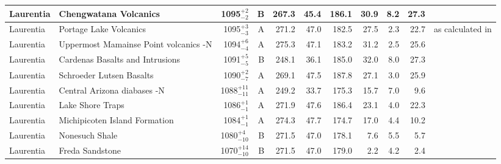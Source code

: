 \documentclass[twocolumn, switch]{article} %
\begin{document}
{\begin{landscape}
\begin{ThreePartTable}
\begin{longtable}{p{1.4 in}p{1.2 in}rrrrrrrrp{1.2 in}}
                     Laurentia &                              Chengwatana Volcanics &     1095$^{+2}_{-2}$ &      B &     267.3 &      45.4 & 186.1 &  30.9 &       8.2 &        27.3 &                                   \cite{Kean1997a} \\ \hline
                     Laurentia &                             Portage Lake Volcanics &     1095$^{+3}_{-3}$ &      A &     271.2 &      47.0 & 182.5 &  27.5 &       2.3 &        22.7 &  \cite{Books1972a, Hnat2006a} as calculated in \cite{Swanson-Hysell2019a} \\ \hline
                     Laurentia &              Uppermost Mamainse Point volcanics -N &     1094$^{+6}_{-4}$ &      A &     275.3 &      47.1 & 183.2 &  31.2 &       2.5 &        25.6 &                         \cite{Swanson-Hysell2014a} \\ \hline
                     Laurentia &                    Cardenas Basalts and Intrusions &     1091$^{+5}_{-5}$ &      B &     248.1 &      36.1 & 185.0 &  32.0 &       8.0 &        27.3 &                                   \cite{Weil2003a} \\ \hline
                     Laurentia &                           Schroeder Lutsen Basalts &     1090$^{+2}_{-7}$ &      A &     269.1 &      47.5 & 187.8 &  27.1 &       3.0 &        25.9 &                              \cite{Fairchild2017a} \\ \hline
                     Laurentia &                        Central Arizona diabases -N &   1088$^{+11}_{-11}$ &      A &     249.2 &      33.7 & 175.3 &  15.7 &       7.0 &         9.6 &                               \cite{Donadini2011b} \\ \hline
                     Laurentia &                                   Lake Shore Traps &     1086$^{+1}_{-1}$ &      A &     271.9 &      47.6 & 186.4 &  23.1 &       4.0 &        22.3 &                                \cite{Kulakov2013a} \\ \hline
                     Laurentia &                      Michipicoten Island Formation &     1084$^{+1}_{-1}$ &      A &     274.3 &      47.7 & 174.7 &  17.0 &       4.4 &        10.2 &                              \cite{Fairchild2017a} \\ \hline
                     Laurentia &                                     Nonesuch Shale &    1080$^{+4}_{-10}$ &      B &     271.5 &      47.0 & 178.1 &   7.6 &       5.5 &         5.7 &                                  \cite{Henry1977a} \\ \hline
                     Laurentia &                                    Freda Sandstone &   1070$^{+14}_{-10}$ &      B &     271.5 &      47.0 & 179.0 &   2.2 &       4.2 &         2.4 &                                  \cite{Henry1977a} \\ \hline

\end{longtable}
\end{ThreePartTable}
\end{landscape}}
\end{document}
